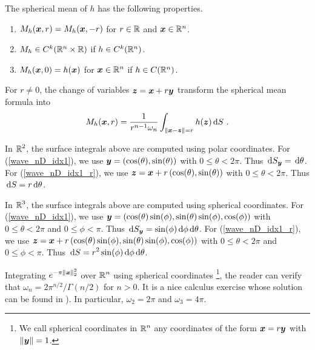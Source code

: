 The spherical mean of $h$ has the following properties.
\begin{enumerate}
\item $M_h({\bm{x}},r) = M_h({\bm{x}},-r)$ for $r\in \mathbb{R}$ and
${\bm{x}} \in \mathbb{R}^n$.
\item $M_h \in C^k(\mathbb{R}^n\times \mathbb{R})$ if $h \in C^k(\mathbb{R}^n)$.
\item $M_h({\bm{x}},0) = h({\bm{x}})$ for ${\bm{x}} \in \mathbb{R}^n$ if
$h \in C(\mathbb{R}^n)$.
\end{enumerate}

For $r\neq 0$, the change of variables ${\bm{z}} = {\bm{x}} + r {\bm{y}}$
transform the spherical mean formula into
\begin{equation} \label{wave_nD_idx1_r}
M_h({\bm{x}},r) = \frac{1}{r^{n-1} \omega_n}
\int_{\|{\bm{x}}-{\bm{z}}\|=r} h({\bm{z}}) \,\mathrm{d}{S} \ .
\end{equation}

In $\displaystyle \mathbb{R}^2$, the surface integrals above are computed using polar
coordinates.  For (\ref{wave_nD_idx1}), we use
$\displaystyle {\bm{y}} = \left( \cos(\theta), \sin(\theta) \right)$
with $0\leq \theta < 2\pi$.  Thus
$\displaystyle \,\mathrm{d}{S}_{{\bm{y}}} = \,\mathrm{d}{\theta}$.  For
(\ref{wave_nD_idx1_r}), we use 
$\displaystyle {\bm{z}} = {\bm{x}} + r\left(\cos(\theta),\sin(\theta) \right)$
with $0\leq \theta < 2\pi$.  Thus
$\displaystyle \,\mathrm{d}{S} = r \,\mathrm{d}{\theta}$.

In $\displaystyle \mathbb{R}^3$, the surface integrals above are computed using
spherical coordinates.  For (\ref{wave_nD_idx1}), we use
$\displaystyle {\bm{y}} = \left( \cos(\theta)\sin(\phi) ,
\sin(\theta)\sin(\phi) , \cos(\phi) \right)$
with $0\leq \theta < 2\pi$ and $0\leq \phi < \pi$.  Thus
$\displaystyle \,\mathrm{d}{S}_{{\bm{y}}} = \sin(\phi) \,\mathrm{d}{\phi}\,\mathrm{d}{\theta}$.  For
(\ref{wave_nD_idx1_r}), we use
$\displaystyle {\bm{z}} = {\bm{x}} + r\left(\cos(\theta)\sin(\phi) ,
\sin(\theta)\sin(\phi) , \cos(\phi) \right)$
with $0\leq \theta < 2\pi$ and $0\leq \phi < \pi$.  Thus
$\displaystyle \,\mathrm{d}{S} = r^2 \sin(\phi) \,\mathrm{d}{\phi}\,\mathrm{d}{\theta}$.

Integrating $\displaystyle e^{-\pi \|{\bm{x}}\|_2^2}$ over
$\displaystyle \mathbb{R}^n$ using spherical coordinates \footnote{We call
spherical coordinates in $\displaystyle \mathbb{R}^n$ any coordinates of the
form ${\bm{x}} = r {\bm{y}}$ with $\|{\bm{y}}\|=1$.}, the reader can verify that
$\displaystyle \omega_n = 2 \pi^{n/2}/\Gamma(n/2)$ for
$n>0$.  It is a nice calculus exercise whose solution can be found in
\cite{FoPDE}).  In particular, $\omega_2 = 2\pi$ and $\omega_3 = 4\pi$. 

